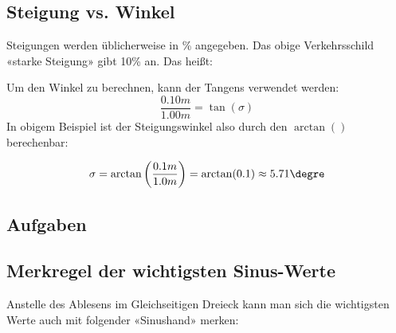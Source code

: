 


\newpage


\subsection{Steigung vs. Winkel}

Steigungen werden üblicherweise in \% angegeben. Das obige
Verkehrsschild «starke Steigung» gibt 10\% an. Das heißt:


Um den Winkel zu berechnen, kann der Tangens verwendet werden:
$$\frac{0.10m}{1.00m} = \tan(\sigma)$$
In obigem Beispiel ist der Steigungswinkel also durch den $\arctan()$
berechenbar:

$$\sigma = \arctan\left(\frac{0.1m}{1.0m}\right) = \arctan(0.1) \approx 5.71\degre$$

\subsection*{Aufgaben}
\newpage



\subsection{Merkregel der wichtigsten Sinus-Werte}

Anstelle des Ablesens im Gleichseitigen Dreieck kann man sich die wichtigsten Werte
auch mit folgender «Sinushand» merken:

\noTRAINER{\vspace{98mm}}%


